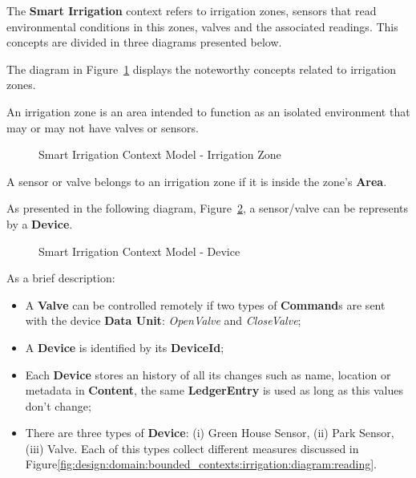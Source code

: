 The \textbf{Smart Irrigation} context refers to irrigation zones, sensors that read environmental conditions in this zones, valves and the associated readings. This concepts are divided in three diagrams presented below.

The diagram in Figure~\ref{fig:design:domain:bounded_contexts:irrigation:diagram:garden} displays the noteworthy concepts related to irrigation zones.

An irrigation zone is an area intended to function as an isolated environment that may or may not have valves or sensors.

\begin{figure}[H]
   \centering
  \resizebox{\columnwidth}{!}
  {
     
  }
  \caption[Smart Irrigation Context Model - Irrigation Zone]{Smart Irrigation Context Model - Irrigation Zone}
  \label{fig:design:domain:bounded_contexts:irrigation:diagram:garden}
\end{figure}

A sensor or valve belongs to an irrigation zone if it is inside the zone's \textbf{Area}.

As presented in the following diagram, Figure~\ref{fig:design:domain:bounded_contexts:irrigation:diagram:device}, a sensor/valve can be represents by a \textbf{Device}.

\begin{figure}[H]
   \centering
  \resizebox{\columnwidth}{!}
  {
     
  }
  \caption[Smart Irrigation Context Model - Device]{Smart Irrigation Context Model - Device}
  \label{fig:design:domain:bounded_contexts:irrigation:diagram:device}
\end{figure}

As a brief description:

\begin{itemize}
   \item A \textbf{Valve} can be controlled remotely if two types of \textbf{Command}s are sent with the device \textbf{Data Unit}: \textit{OpenValve} and \textit{CloseValve};
   \item A \textbf{Device} is identified by its \textbf{DeviceId};
   \item Each \textbf{Device} stores an history of all its changes such as name, location or metadata in \textbf{Content}, the same \textbf{LedgerEntry} is used as long as this values don't change;
   \item There are three types of \textbf{Device}: (i) Green House Sensor, (ii) Park Sensor, (iii) Valve. Each of this types collect different measures discussed in Figure\ref{fig:design:domain:bounded_contexts:irrigation:diagram:reading}.
\end{itemize}

